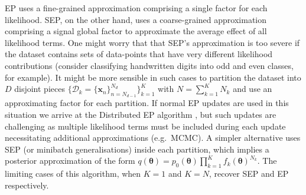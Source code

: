 EP uses a fine-grained approximation comprising a single factor for each likelihood. SEP, on the other hand, uses a coarse-grained approximation comprising a signal global factor to approximate the average effect of all likelihood terms. One might worry that that SEP's approximation is too severe if the dataset contains sets of data-points that have very different likelihood contributions (consider classifying handwritten digits into odd and even classes, for example). It might be more sensible in such cases to partition the dataset into $D$ disjoint pieces $\{ \mathcal{D}_k = \{\bm{x}_n\}_{n=N_{d-1}}^{N_d} \}_{k=1}^{K}$ with $N = \sum_{k=1}^K N_k$ and use an approximating factor for each partition. If normal EP updates are used in this situation we arrive at the Distributed EP algorithm \cite{gelman:dep}\cite{xu:sms}, but such updates are challenging as multiple likelihood terms must be included during each update necessitating additional approximations (e.g.~MCMC). A simpler alternative uses SEP (or minibatch generalisations) inside each partition, which implies a posterior approximation of the form $q(\bm{\theta}) = p_0(\bm{\theta}) \prod_{k=1}^K f_{k}(\bm{\theta})^{N_k}$. The limiting cases of this algorithm, when $K=1$ and $K=N$, recover SEP and EP respectively. 


%
%


